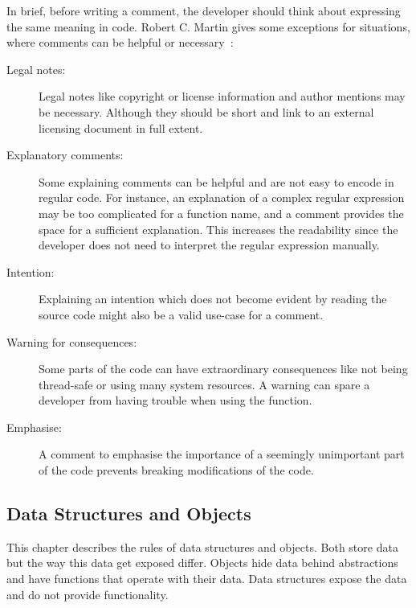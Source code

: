 In brief, before writing a comment, the developer should think about expressing the same meaning in code. Robert C. Martin gives some exceptions for situations, where comments can be helpful or necessary~\cite{martin_clean_2009}:

\begin{description}
    \item[Legal notes:] Legal notes like copyright or license information and author mentions may be necessary. Although they should be short and link to an external licensing document in full extent.
    \item[Explanatory comments:] Some explaining comments can be helpful and are not easy to encode in regular code. For instance, an explanation of a complex regular expression may be too complicated for a function name, and a comment provides the space for a sufficient explanation. This increases the readability since the developer does not need to interpret the regular expression manually.
    \item[Intention:] Explaining an intention which does not become evident by reading the source code might also be a valid use-case for a comment. 
    \item[Warning for consequences:] Some parts of the code can have extraordinary consequences like not being thread-safe or using many system resources. A warning can spare a developer from having trouble when using the function.
    \item[Emphasise:] A comment to emphasise the importance of a seemingly unimportant part of the code prevents breaking modifications of the code. 
\end{description}

\subsection{Data Structures and Objects}
This chapter describes the rules of data structures and objects. Both store data but the way this data get exposed differ. Objects hide data behind abstractions and have functions that operate with their data. Data structures expose the data and do not provide functionality. 

